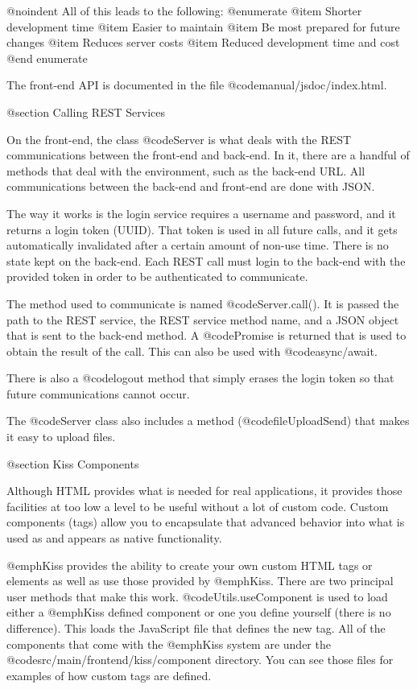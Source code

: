@noindent
All of this leads to the following:
@enumerate
@item
Shorter development time
@item 
Easier to maintain
@item
Be most prepared for future changes
@item
Reduces server costs
@item
Reduced development time and cost
@end enumerate

The front-end API is documented in the file @code{manual/jsdoc/index.html}.



@section Calling REST Services

On the front-end, the class @code{Server} is what deals with the REST
communications between the front-end and back-end.  In it, there are a
handful of methods that deal with the environment, such as the back-end
URL.  All communications between the back-end and front-end are done
with JSON.

The way it works is the login service requires a username and
password, and it returns a login token (UUID).  That token is used in
all future calls, and it gets automatically invalidated after a certain
amount of non-use time.  There is no state kept on the back-end.  Each
REST call must login to the back-end with the provided token in order
to be authenticated to communicate.

The method used to communicate is named @code{Server.call()}. It is passed the
path to the REST service, the REST service method name, and a JSON
object that is sent to the back-end method.  A @code{Promise} is
returned that is used to obtain the result of the call.  This
can also be used with @code{async/await}.

There is also a @code{logout} method that simply erases the
login token so that future communications cannot occur.

The @code{Server} class also includes a method (@code{fileUploadSend})
that makes it easy to upload files.

@section Kiss Components


Although HTML provides what is needed for real applications, it
provides those facilities at too low a level to be useful without a
lot of custom code.  Custom components (tags) allow you to encapsulate
that advanced behavior into what is used as and appears as native
functionality.

@emph{Kiss} provides the ability to create your own custom HTML tags
or elements as well as use those provided by @emph{Kiss}.  There are
two principal user methods that make this work.
@code{Utils.useComponent} is used to load either a @emph{Kiss} defined
component or one you define yourself (there is no difference).  This
loads the JavaScript file that defines the new tag.  All of the
components that come with the @emph{Kiss} system are under the
@code{src/main/frontend/kiss/component} directory.  You can see those
files for examples of how custom tags are defined.

